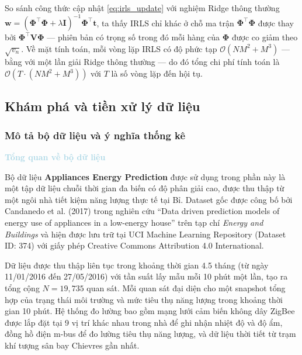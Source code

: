 So sánh công thức cập nhật \eqref{eq:irls_update} với nghiệm Ridge thông 
thường $\boldsymbol{w} = (\boldsymbol{\Phi}^{\top}\boldsymbol{\Phi} + 
\lambda\mathbf{I})^{-1}\boldsymbol{\Phi}^{\top}\boldsymbol{t}$, ta thấy 
IRLS chỉ khác ở chỗ ma trận $\boldsymbol{\Phi}^{\top}\boldsymbol{\Phi}$ 
được thay bởi $\boldsymbol{\Phi}^{\top}\mathbf{V}\boldsymbol{\Phi}$ --- 
phiên bản có trọng số trong đó mỗi hàng của $\boldsymbol{\Phi}$ được co 
giảm theo $\sqrt{v_n}$. Về mặt tính toán, mỗi vòng lặp IRLS có độ phức 
tạp $\mathcal{O}(NM^2 + M^3)$ --- bằng với một lần giải Ridge thông thường 
--- do đó tổng chi phí tính toán là $\mathcal{O}(T \cdot (NM^2 + M^3))$ 
với $T$ là số vòng lặp đến hội tụ.

\subsection{Khám phá và tiền xử lý dữ liệu}

\subsubsection{Mô tả bộ dữ liệu và ý nghĩa thống kê}

\vspace{0.5em}
\noindent\textcolor{lightblue}{\textbf{Tổng quan về bộ dữ liệu}}
\vspace{0.5em}

Bộ dữ liệu \textbf{Appliances Energy Prediction} được sử dụng trong phần này là một tập dữ liệu chuỗi thời gian đa biến có độ phân giải cao, được thu thập từ một ngôi nhà tiết kiệm năng lượng thực tế tại Bỉ. Dataset gốc được công bố bởi Candanedo et al. (2017) trong nghiên cứu ``Data driven prediction models of energy use of appliances in a low-energy house'' trên tạp chí \textit{Energy and Buildings} và hiện được lưu trữ tại UCI Machine Learning Repository (Dataset ID: 374) với giấy phép Creative Commons Attribution 4.0 International.

Dữ liệu được thu thập liên tục trong khoảng thời gian 4.5 tháng (từ ngày 11/01/2016 đến 27/05/2016) với tần suất lấy mẫu mỗi 10 phút một lần, tạo ra tổng cộng $N = 19{,}735$ quan sát. Mỗi quan sát đại diện cho một snapshot tổng hợp của trạng thái môi trường và mức tiêu thụ năng lượng trong khoảng thời gian 10 phút. Hệ thống đo lường bao gồm mạng lưới cảm biến không dây ZigBee được lắp đặt tại 9 vị trí khác nhau trong nhà để ghi nhận nhiệt độ và độ ẩm, đồng hồ điện m-bus để đo lường tiêu thụ năng lượng, và dữ liệu thời tiết từ trạm khí tượng sân bay Chievres gần nhất.

